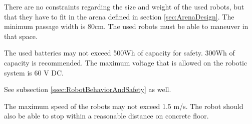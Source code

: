 There are no constraints regarding the size and weight of the used robots, but that they have to fit in the arena defined in section \ref{sec:ArenaDesign}. The minimum passage width is $80\si{\centi\meter}$. The used robots must be able to maneuver in that space.\par

The used batteries may not exceed 500Wh of capacity for safety. 300Wh of capacity is recommended. The maximum voltage that is allowed on the robotic system is 60 V DC.

See subsection \ref{ssec:RobotBehaviorAndSafety} as well.\par 

The maximum speed of the robots may not exceed 1.5 m/s. The robot should also be able to stop within a reasonable distance on concrete floor.

